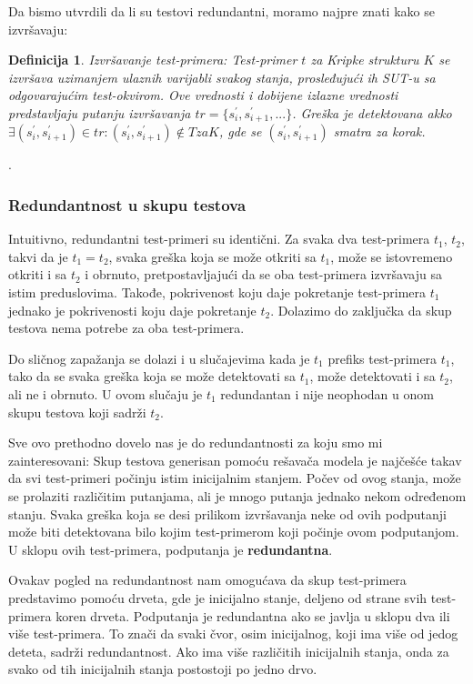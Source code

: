 \documentclass[a4paper]{article}
\newtheorem{definition}{Definicija}[section]
\begin{document}
Da bismo utvrdili da li su testovi redundantni, moramo najpre znati kako se izvršavaju:

\begin{definition}{Izvršavanje test-primera:}
Test-primer $t$ za Kripke strukturu $K$ se izvršava uzimanjem ulaznih varijabli svakog stanja, prosleđujući ih SUT-u sa odgovarajućim test-okvirom. Ove vrednosti i dobijene izlazne vrednosti predstavljaju putanju izvršavanja $ tr = \{s_{i}^{'}, s_{i+1}^{'}, ...\} $. Greška je detektovana akko $ \exists (s_{i}^{'}, s_{i+1}^{'}) \in tr : (s_{i}^{'}, s_{i+1}^{'}) \notin T za K $, gde se $ (s_{i}^{'}, s_{i+1}^{'})$ smatra za korak.
\end{definition}.

\subsubsection{Redundantnost u skupu testova}
\label{subsubsec:redundantnost}

Intuitivno, redundantni test-primeri su identični. Za svaka dva test-primera $t_1$, $t_2$, takvi da je $ t_1 = t_2$, svaka greška koja se može otkriti sa $t_1$, može se istovremeno otkriti i sa $t_2$ i obrnuto, pretpostavljajući da se oba test-primera izvršavaju sa istim preduslovima. Takođe, pokrivenost koju daje pokretanje test-primera $t_1$ jednako je pokrivenosti koju daje pokretanje $t_2$. Dolazimo do zaključka da skup testova nema potrebe za oba test-primera.

Do sličnog zapažanja se dolazi i u slučajevima kada je $t_1$ prefiks test-primera $t_1$, tako da se svaka greška koja se može detektovati sa $t_1$, može detektovati i sa $t_2$, ali ne i obrnuto. U ovom slučaju je $t_1$ redundantan i nije neophodan u onom skupu testova koji sadrži $t_2$.

Sve ovo prethodno dovelo nas je do redundantnosti za koju smo mi zainteresovani: Skup testova generisan pomoću rešavača modela je najčešće takav da svi test-primeri počinju istim inicijalnim stanjem. Počev od ovog stanja, može se prolaziti različitim putanjama, ali je mnogo putanja jednako nekom određenom stanju. Svaka greška koja se desi prilikom izvršavanja neke od ovih podputanji može biti detektovana bilo kojim test-primerom koji počinje ovom podputanjom. U sklopu ovih test-primera, podputanja je \textbf{redundantna}.

Ovakav pogled na redundantnost nam omogućava da skup test-primera predstavimo pomoću drveta, gde je inicijalno stanje, deljeno od strane svih test-primera koren drveta. Podputanja je redundantna ako se javlja u sklopu dva ili više test-primera. To znači da svaki čvor, osim inicijalnog, koji ima više od jedog deteta, sadrži redundantnost. Ako ima više različitih inicijalnih stanja, onda za svako od tih inicijalnih stanja postostoji po jedno drvo.
\end{document}
